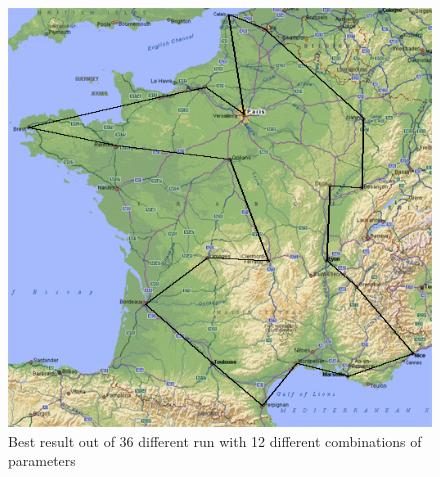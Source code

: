 \documentclass{article}
\begin{document}
\begin{figure}
\centering
\includegraphics[width=\textwidth]{../result/exercise3/10_1_3/best.png}
\caption{Best result out of 36 different run with 12 different combinations of parameters}
\end{figure}    
\end{document}
